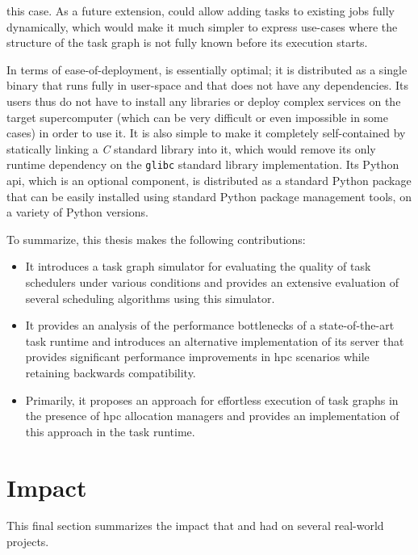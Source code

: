 \begin{description}[wide=0pt]
		this case. As a future extension, \hyperqueue{} could allow adding tasks to existing
		jobs fully dynamically, which would make it much simpler to express use-cases where the structure
		of the task graph is not fully known before its execution starts.
	\item[Deployment] In terms of ease-of-deployment, \hyperqueue{} is essentially optimal; it is
		distributed as a single binary that runs fully in user-space and that does not have any
		dependencies. Its users thus do not have to install any libraries or deploy complex services on the
		target supercomputer (which can be very difficult or even impossible in some cases) in order to use
		it. It is also simple to make it completely self-contained by statically linking a
		\emph{C} standard library into it, which would remove its only runtime dependency
		on the \texttt{glibc} standard library implementation. Its Python
		\gls{api}, which is an optional component, is distributed as a standard Python
		package that can be easily installed using standard Python package management tools, on a variety
		of Python versions.
\end{description}

To summarize, this thesis makes the following contributions:
\begin{itemize}
	\item It introduces a task graph simulator for evaluating the quality of task schedulers under various
	      conditions and provides an extensive evaluation of several scheduling algorithms using this
	      simulator.
	\item It provides an analysis of the performance bottlenecks of a state-of-the-art task runtime
	      \dask{} and introduces an alternative implementation of its server that provides
	      significant performance improvements in \gls{hpc} scenarios while retaining
	      backwards compatibility.
	\item Primarily, it proposes an approach for effortless execution of task graphs in the presence of
	      \gls{hpc} allocation managers and provides an implementation of this approach in
	      the \hyperqueue{} task runtime.
\end{itemize}

\section{Impact}
This final section summarizes the impact that \rsds{} and
\hyperqueue{} had on several real-world projects.

